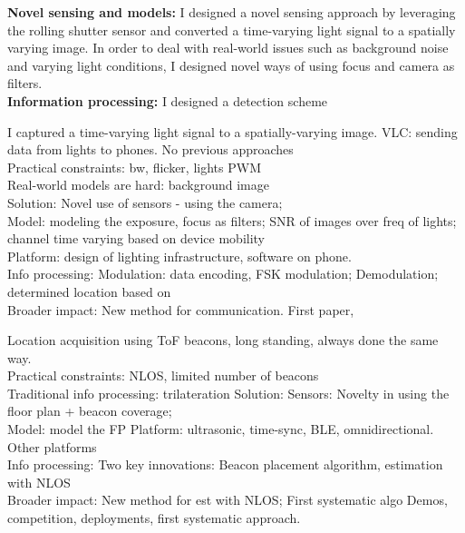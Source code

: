 \documentclass[10pt]{article}
\begin{document}
\textbf{Novel sensing and models: }
 I designed a novel sensing approach by leveraging the rolling shutter sensor and converted a time-varying light signal to a spatially varying image. In order to deal with real-world issues such as background noise and varying light conditions, I designed novel ways of using focus and camera as filters.\\
 \textbf{Information processing: } I designed a detection scheme 


I captured a time-varying light signal to a spatially-varying image.  
VLC: sending data from lights to phones. No previous approaches\\
Practical constraints: bw, flicker, lights PWM\\
Real-world models are hard: background image\\
Solution:
Novel use of sensors - using the camera;\\
Model: modeling the exposure, focus as filters; SNR of images over freq of lights; channel time varying based on device mobility\\
Platform: design of lighting infrastructure, software on phone.\\
Info processing: Modulation: data encoding, FSK modulation; Demodulation; determined location based on \\
Broader impact:
New method for communication.
First paper, 

Location acquisition using ToF beacons, long standing, always done the same way.\\
Practical constraints: NLOS, limited number of beacons\\
Traditional info processing: trilateration 
Solution:
Sensors: Novelty in using the floor plan + beacon coverage;\\
Model: model the FP
Platform: ultrasonic, time-sync, BLE, omnidirectional. Other platforms\\
Info processing: Two key innovations: Beacon placement algorithm, estimation with NLOS\\
Broader impact:
New method for est with NLOS;
First systematic algo 
Demos, competition, deployments, first systematic approach.
\end{document}
